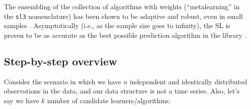 \documentclass[12pt, krantz2,]{krantz}
\newcommand{\passthrough}[1]{#1}
\theoremstyle{definition}
\theoremstyle{definition}
\theoremstyle{definition}
\newcommand{\1}{\mathbbm{1}}
\begin{document}
The ensembling of the collection of algorithms with weights (``metalearning'' in
the \passthrough{\lstinline!sl3!} nomenclature) has been shown to be adaptive and robust, even in small
samples \citep{polley2010super}. Asymptotically (i.e., as the sample size goes to
infinity), the SL is proven to be as accurate as the best possible prediction
algorithm in the library \citep{vdl2003unified, vaart2006oracle}.

\hypertarget{step-by-step-overview}{%
\subsection{Step-by-step overview}\label{step-by-step-overview}}

Consider the scenario in which we have \(n\) independent and identically
distributed observations in the data, and our data structure is not a time
series. Also, let's say we have \(k\) number of candidate learners/algorithms.
\end{document}
